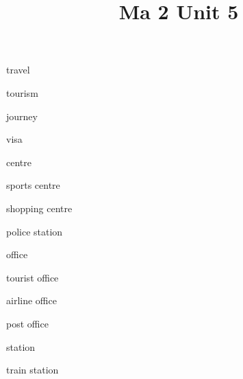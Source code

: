 \documentclass[avery5371,grid,frame]{flashcards}
\title{Ma 2 Unit 5}
\begin{document}
\begin{flashcard}{\LARGE travel}
\LARGE {}
\end{flashcard}
\begin{flashcard}{\LARGE tourism}
\LARGE {}
\end{flashcard}
\begin{flashcard}{\LARGE journey}
\LARGE {}
\end{flashcard}
\begin{flashcard}{\LARGE visa}
\LARGE {}
\end{flashcard}
\begin{flashcard}{\LARGE centre}
\LARGE {}
\end{flashcard}
\begin{flashcard}{\LARGE sports centre}
\LARGE {}
\end{flashcard}
\begin{flashcard}{\LARGE shopping centre}
\LARGE {}
\end{flashcard}
\begin{flashcard}{\LARGE police station}
\LARGE {}
\end{flashcard}
\begin{flashcard}{\LARGE office}
\LARGE {}
\end{flashcard}
\begin{flashcard}{\LARGE tourist office}
\LARGE {}
\end{flashcard}
\begin{flashcard}{\LARGE airline office}
\LARGE {}
\end{flashcard}
\begin{flashcard}{\LARGE post office}
\LARGE {}
\end{flashcard}
\begin{flashcard}{\LARGE station}
\LARGE {}
\end{flashcard}
\begin{flashcard}{\LARGE train station}
\LARGE {}
\end{flashcard}
\end{document}
